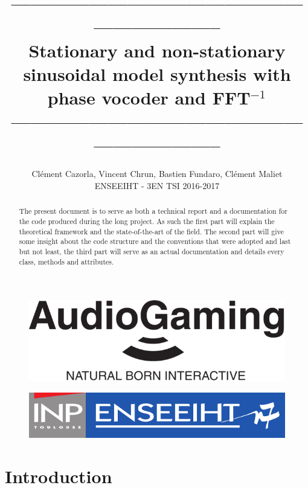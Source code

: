 \documentclass[]{article}
\title{-----------------------------------------------------------------\\Stationary and non-stationary sinusoidal model synthesis with phase vocoder and FFT$^{-1}$\\-----------------------------------------------------------------}
\author{Cl\'ement Cazorla, Vincent Chrun, Bastien Fundaro, Cl\'ement Maliet \\ENSEEIHT - 3EN TSI 2016-2017}
\begin{document}
\maketitle

\begin{abstract}
The present document is to serve as both a technical report and a documentation for the code produced during the long project. As such the first part will explain the theoretical framework and the state-of-the-art of the field. The second part will give some insight about the code structure and the conventions that were adopted and last but not least, the third part will serve as an actual documentation and details every class, methods and attributes.
\end{abstract}
 \vspace{4cm}
	\begin{figure}[H]
		\centering
		\includegraphics[scale=0.28]{ag.png}
	\end{figure}
	\begin{figure}[H]
		\centering
		\includegraphics[scale=0.28]{enseeiht.png}
	\end{figure}

\newpage
\tableofcontents


\newpage
\part{Introduction}\label{sec:introduction}
\end{document}
